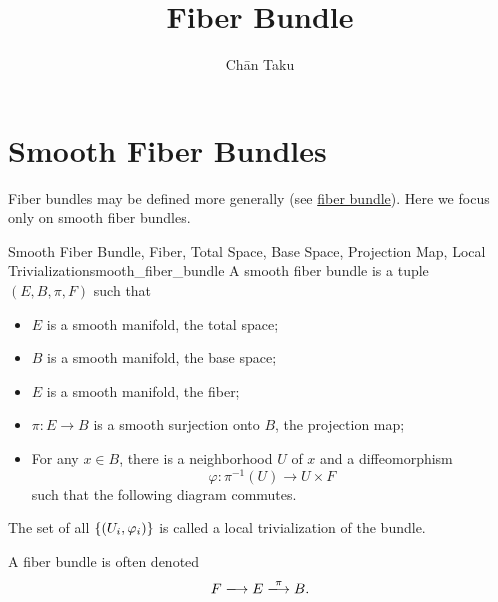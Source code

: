 \documentclass{article}
\title{Fiber Bundle}
\author{Ch\=an Taku}
\begin{document}
\maketitle

\section{Smooth Fiber Bundles}

Fiber bundles may be defined more generally (see \href{https://ncatlab.org/nlab/show/fiber+bundle}{fiber bundle}).
Here we focus only on smooth fiber bundles.

\begin{definition}{Smooth Fiber Bundle, Fiber, Total Space, Base Space, Projection Map, Local Trivialization}{smooth_fiber_bundle}
    A smooth fiber bundle is a tuple $(E,B,\pi,F)$ such that
    \begin{itemize}
        \item $E$ is a smooth manifold, the total space;
        \item $B$ is a smooth manifold, the base space;
        \item $E$ is a smooth manifold, the fiber;
        \item $\pi: E\rightarrow B$ is a smooth surjection onto $B$, the projection map;
        \item For any $x\in B$, there is a neighborhood $U$ of $x$ and a diffeomorphism
        \[ \varphi: \pi^{-1}(U) \rightarrow U \times F \]
        such that the following diagram commutes.
        \begin{center}
        \end{center}
    \end{itemize}
    The set of all $\qty{(U_i,\varphi_i)}$ is called a local trivialization of the bundle.
\end{definition}

A fiber bundle is often denoted
\[ F \xlongrightarrow{} E \xlongrightarrow{\pi} B. \]
\end{document}
